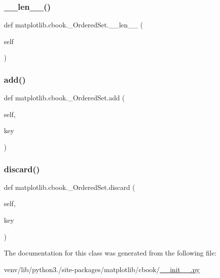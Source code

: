 \subsubsection{\texorpdfstring{\+\_\+\+\_\+len\+\_\+\+\_\+()}{\_\_len\_\_()}}
{\footnotesize\ttfamily def matplotlib.\+cbook.\+\_\+\+Ordered\+Set.\+\_\+\+\_\+len\+\_\+\+\_\+ (\begin{DoxyParamCaption}\item[{}]{self }\end{DoxyParamCaption})}

\mbox{\label{classmatplotlib_1_1cbook_1_1__OrderedSet_a56053fed44f77b8b5632de663cd9c3f8}} 
\subsubsection{\texorpdfstring{add()}{add()}}
{\footnotesize\ttfamily def matplotlib.\+cbook.\+\_\+\+Ordered\+Set.\+add (\begin{DoxyParamCaption}\item[{}]{self,  }\item[{}]{key }\end{DoxyParamCaption})}

\mbox{\label{classmatplotlib_1_1cbook_1_1__OrderedSet_a82003fe3ca74201b5ea4b8d7ecd426fd}} 
\subsubsection{\texorpdfstring{discard()}{discard()}}
{\footnotesize\ttfamily def matplotlib.\+cbook.\+\_\+\+Ordered\+Set.\+discard (\begin{DoxyParamCaption}\item[{}]{self,  }\item[{}]{key }\end{DoxyParamCaption})}



The documentation for this class was generated from the following file\+:\begin{DoxyCompactItemize}
\item 
venv/lib/python3./site-\/packages/matplotlib/cbook/\hyperlink{venv_2lib_2python3_89_2site-packages_2matplotlib_2cbook_2____init_____8py}{\+\_\+\+\_\+init\+\_\+\+\_\+.\+py}\end{DoxyCompactItemize}
